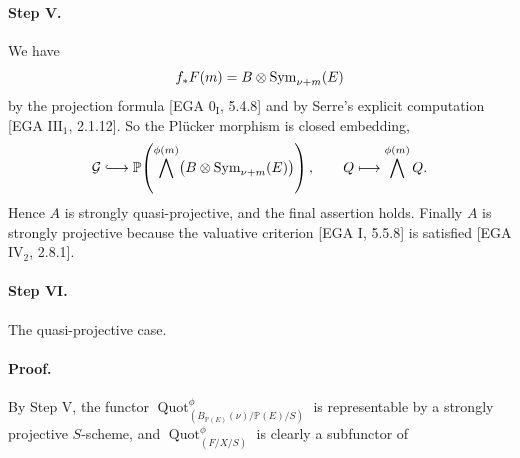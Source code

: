 \paragraph{Step V.}
We have
\[
f_*F(m)=B\otimes\operatorname{Sym}_{\nu+m}(E)
\]
by the projection formula [EGA $0_{\mathrm I}$, 5.4.8] and by Serre's
explicit computation [EGA $\mathrm{III}_1$, 2.1.12]. So the Pl\"ucker
morphism is closed embedding,
\[
\mathcal G\lhook\joinrel\longrightarrow
\mathbb P\!\left(\bigwedge^{\phi(m)}
  \bigl(B\otimes\Sym_{\nu+m}(E)\bigr)\right),
\qquad
Q\longmapsto\bigwedge^{\phi(m)}Q.
\]
Hence $A$ is strongly quasi-projective, and the final assertion holds.
Finally $A$ is strongly projective because the valuative criterion
[EGA I, 5.5.8] is satisfied [EGA $\mathrm{IV}_2$, 2.8.1].

\paragraph{Step VI.}
The quasi-projective case.

\paragraph{Proof.}
By Step V, the functor
$\operatorname{Quot}^{\phi}_{(B_{\mathbb P(E)}(\nu)/\mathbb P(E)/S)}$ is
representable by a strongly projective $S$-scheme, and
$\operatorname{Quot}^{\phi}_{(F/X/S)}$ is clearly a subfunctor of
